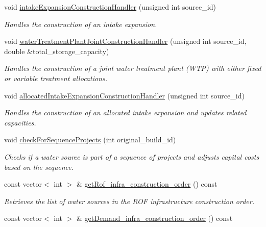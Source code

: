 \begin{DoxyCompactItemize}
void \mbox{\hyperlink{classInfrastructureManager_aed62e86a9737e385c821d44ea70922e9}{intake\+Expansion\+Construction\+Handler}} (unsigned int source\+\_\+id)
\begin{DoxyCompactList}\small\item\em Handles the construction of an intake expansion. \end{DoxyCompactList}\item 
void \mbox{\hyperlink{classInfrastructureManager_a669881b881b090b3dd8fe70e3ffbf7f6}{water\+Treatment\+Plant\+Joint\+Construction\+Handler}} (unsigned int source\+\_\+id, double \&total\+\_\+storage\+\_\+capacity)
\begin{DoxyCompactList}\small\item\em Handles the construction of a joint water treatment plant (W\+TP) with either fixed or variable treatment allocations. \end{DoxyCompactList}\item 
void \mbox{\hyperlink{classInfrastructureManager_a4fc2e6e4fa74374b6669f5360dcda9d9}{allocated\+Intake\+Expansion\+Construction\+Handler}} (unsigned int source\+\_\+id)
\begin{DoxyCompactList}\small\item\em Handles the construction of an allocated intake expansion and updates related capacities. \end{DoxyCompactList}\item 
void \mbox{\hyperlink{classInfrastructureManager_a4eca31074654eb197ba33342eee3bd32}{check\+For\+Sequence\+Projects}} (int original\+\_\+build\+\_\+id)
\begin{DoxyCompactList}\small\item\em Checks if a water source is part of a sequence of projects and adjusts capital costs based on the sequence. \end{DoxyCompactList}\item 
const vector$<$ int $>$ \& \mbox{\hyperlink{classInfrastructureManager_a0f944c7704cc5418ba58b71c7a1e15a7}{get\+Rof\+\_\+infra\+\_\+construction\+\_\+order}} () const
\begin{DoxyCompactList}\small\item\em Retrieves the list of water sources in the R\+OF infrastructure construction order. \end{DoxyCompactList}\item 
const vector$<$ int $>$ \& \mbox{\hyperlink{classInfrastructureManager_aac2a99dbffe7f784f09de907ad384d8b}{get\+Demand\+\_\+infra\+\_\+construction\+\_\+order}} () const

\end{DoxyCompactItemize}
